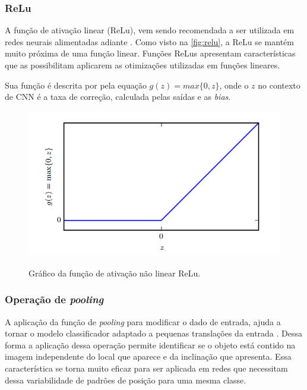 \subsubsection{ReLu}

A função de ativação linear (ReLu), vem sendo recomendada a ser utilizada em redes neurais alimentadas adiante \cite{glorot2011deep}. Como visto na \autoref{fig:relu}, a ReLu se mantém muito próxima de uma função linear. Funções ReLus apresentam características que as possibilitam aplicarem as otimizações utilizadas em funções lineares. 
\par Sua função é descrita por pela equação $g(z)=max\{0,z\}$, onde o $z$ no contexto de CNN é a taxa de correção, calculada pelas saídas e as \textit{bias}. 

\begin{figure}[H]
  \centering
  \caption{Gráfico da função de ativação não linear ReLu.}
  \includegraphics[width=400pt]{dados/figuras/relu}
  \label{fig:relu}
\end{figure}

\subsubsection{Operação de \textit{pooling}}
A aplicação da função de \textit{pooling} para modificar o dado de entrada, ajuda a tornar o modelo classificador adaptado a pequenas translações da entrada \cite{Goodfellow-et-al-2016}. Dessa forma a aplicação dessa operação permite identificar se o objeto está contido na imagem independente do local que aparece e da inclinação que apresenta. Essa característica se torna muito eficaz para ser aplicada em redes que necessitam dessa variabilidade de padrões de posição para uma mesma classe.

